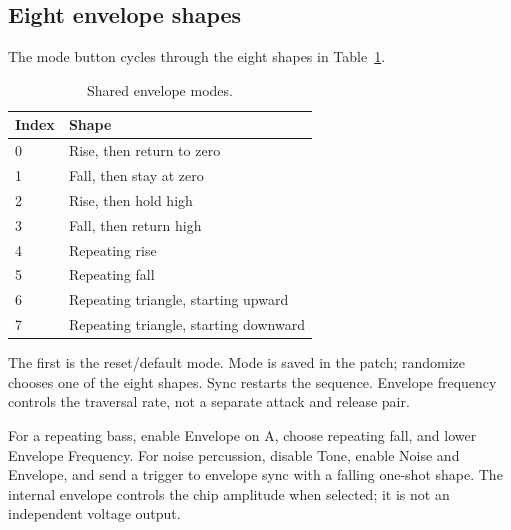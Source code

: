 \subsection{Eight envelope shapes}
The mode button cycles through the eight shapes in
Table~\ref{tab:envelope-generator}.
\begin{table}[ht]\centering
\begin{tabularx}{\textwidth}{@{}lX@{}}
\toprule Index & Shape \\\midrule
0 & Rise, then return to zero \\
1 & Fall, then stay at zero \\
2 & Rise, then hold high \\
3 & Fall, then return high \\
4 & Repeating rise \\
5 & Repeating fall \\
6 & Repeating triangle, starting upward \\
7 & Repeating triangle, starting downward \\\bottomrule
\end{tabularx}
\caption{Shared envelope modes.}\label{tab:envelope-generator}
\end{table}

The first is the
reset/default mode. Mode is saved in the patch; randomize chooses one of
the eight shapes. Sync restarts the sequence. Envelope frequency controls
the traversal rate, not a separate attack and release pair.

For a repeating bass, enable Envelope on A, choose repeating fall, and lower
Envelope Frequency. For noise percussion, disable Tone, enable Noise and
Envelope, and send a trigger to envelope sync with a falling one-shot shape.
The internal envelope controls the chip amplitude when selected; it is not
an independent voltage output.
